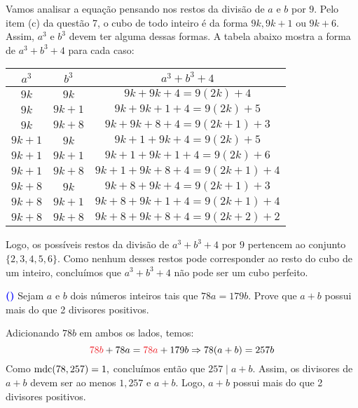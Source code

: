 \documentclass[12pt, a4paper]{article}
\newcommand{\mdc}{{\rm mdc}}
\newcounter{exercicio}[section]
\newenvironment{exercicio}[1][]{\refstepcounter{exercicio}\par\medskip
 \textcolor{blue}{\bf(\theexercicio)} \rmfamily}{\medskip }
\begin{document}
\begin{solution}
Vamos analisar a equação pensando nos restos da divisão de $a$ e $b$ por $9.$ Pelo item (c) da questão 7, o cubo de todo inteiro é da forma $9k, 9k+1$ ou $9k+6.$ Assim, $a^3$ e $b^3$ devem ter alguma dessas formas. A tabela abaixo mostra a forma de $a^3 + b^3 + 4$ para cada caso:
\begin{table}[h]
\centering
\begin{tabular}{|c|c|c|}
\hline
\textbf{$a^3$} & \textbf{$b^3$}          & \textbf{$a^3 + b^3 + 4$}                   \\ \hline
$9k$         & $9k$            & $9k+9k+4 = 9(2k)+4$                    \\ \hline
$9k$       & $9k+1$     & $9k+9k+1+4 = 9(2k)+5$ \\ \hline
$9k$       & $9k+8$     & $9k+9k+8+4 = 9(2k+1)+3$ \\ \hline
$9k+1$       & $9k$     & $9k+1+9k+4 = 9(2k)+5$ \\ \hline
$9k+1$       & $9k+1$     & $9k+1+9k+1+4 = 9(2k)+6$ \\ \hline
$9k+1$         & $9k+8$            & $9k+1+9k+8+4 = 9(2k+1)+4$                    \\ \hline
$9k+8$         & $9k$            & $9k+8+9k+4 = 9(2k+1)+3$                    \\ \hline
$9k+8$         & $9k+1$            & $9k+8+9k+1+4 = 9(2k+1)+4$                    \\ \hline
$9k+8$         & $9k+8$            & $9k+8+9k+8+4 = 9(2k+2)+2$                    \\ \hline

\end{tabular}
\end{table}
Logo, os possíveis restos da divisão de $a^3 + b^3 + 4$ por $9$ pertencem ao conjunto $\{ 2, 3,4,5,6\}.$ Como nenhum desses restos pode corresponder ao resto do cubo de um inteiro, concluímos que $a^3 + b^3 + 4$ não pode ser um cubo perfeito.
\end{solution}
\begin{exercicio}
Sejam $a$ e $b$ dois números inteiros tais que $78a = 179b.$ Prove que $a + b$ possui mais do que 2 divisores positivos.
\end{exercicio}
\begin{solution}
Adicionando $78b$ em ambos os lados, temos:
\[
    \textcolor{Red}{78b} + 78a = \textcolor{Red}{78a} + 179b \Rightarrow 78(a+b) = 257b
    \]
Como $\mdc(78, 257) = 1,$ concluímos então que $257 \mid a + b.$ Assim, os divisores de $a+b$ devem ser ao menos $1, 257$ e $a+b.$ Logo, $a + b$ possui mais do que 2 divisores positivos.
\end{solution}
\end{document}
